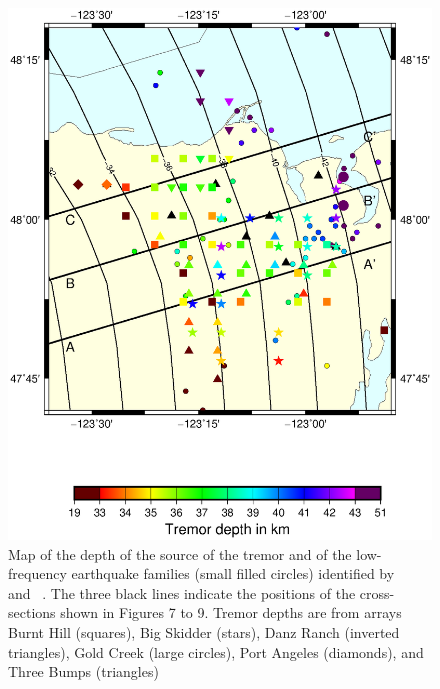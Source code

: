 \documentclass[draft]{agujournal2019}
\begin{document}
\begin{figure}
\noindent\includegraphics[width=\textwidth, trim={1cm 5cm 3.5cm 4cm},clip]{figures/depth_PWS_PWS.eps}
\caption{Map of the depth of the source of the tremor and of the low-frequency earthquake families (small filled circles) identified by ~ and ~. The three black lines indicate the positions of the cross-sections shown in Figures 7 to 9. Tremor depths are from arrays Burnt Hill (squares), Big Skidder (stars), Danz Ranch (inverted triangles),  Gold Creek (large circles), Port Angeles (diamonds), and Three Bumps (triangles)}
\label{pngfiguresample}
\end{figure}
\end{document}
